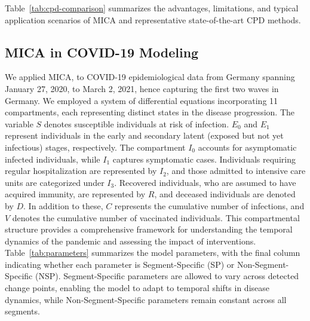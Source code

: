 \documentclass[10pt,letterpaper]{article}
\begin{document}
Table~\ref{tab:cpd-comparison} summarizes the advantages, limitations, and typical application scenarios of MICA and representative state-of-the-art CPD methods.



\subsection*{MICA in COVID-19 Modeling}

We applied MICA, to COVID-19 epidemiological data from Germany spanning January 27, 2020, to March 2, 2021, hence capturing the first two waves in Germany. We employed a system of differential equations incorporating 11 compartments, each representing distinct states in the disease progression.
The variable $S$ denotes susceptible individuals at risk of infection. $E_0$ and $E_1$ represent individuals in the early and secondary latent (exposed but not yet infectious) stages, respectively. The compartment $I_0$ accounts for asymptomatic infected individuals, while $I_1$ captures symptomatic cases. Individuals requiring regular hospitalization are represented by $I_2$, and those admitted to intensive care units are categorized under $I_3$. Recovered individuals, who are assumed to have acquired immunity, are represented by $R$, and deceased individuals are denoted by $D$. In addition to these, $C$ represents the cumulative number of infections, and $V$ denotes the cumulative number of vaccinated individuals.
This compartmental structure provides a comprehensive framework for understanding the temporal dynamics of the pandemic and assessing the impact of interventions. Table~\ref{tab:parameters} summarizes the model parameters, with the final column indicating whether each parameter is Segment-Specific (SP) or Non-Segment-Specific (NSP). Segment-Specific parameters are allowed to vary across detected change points, enabling the model to adapt to temporal shifts in disease dynamics, while Non-Segment-Specific parameters remain constant across all segments.

\clearpage
\end{document}
